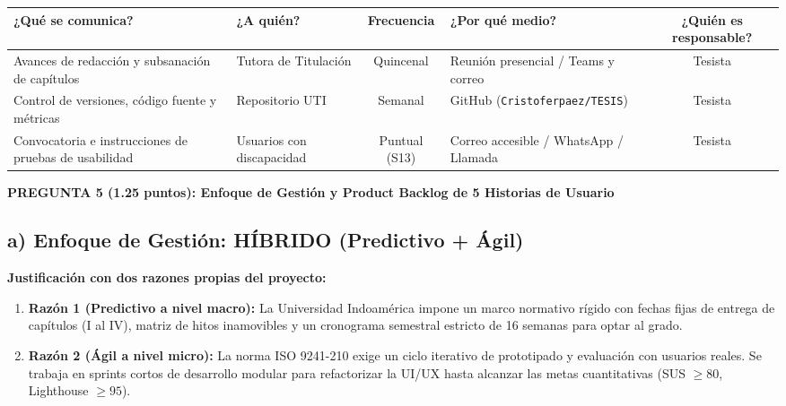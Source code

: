 \documentclass[10pt,a4paper]{article}
\begin{document}
\begin{center}
\footnotesize
\renewcommand{\arraystretch}{1.15}
\begin{tabularx}{\textwidth}{X X c X c}
\toprule
\textbf{¿Qué se comunica?} & \textbf{¿A quién?} & \textbf{Frecuencia} & \textbf{¿Por qué medio?} & \textbf{¿Quién es responsable?} \\
\midrule
Avances de redacción y subsanación de capítulos & Tutora de Titulación & Quincenal & Reunión presencial / Teams y correo & Tesista \\
Control de versiones, código fuente y métricas & Repositorio UTI & Semanal & GitHub (\texttt{Cristoferpaez/TESIS}) & Tesista \\
Convocatoria e instrucciones de pruebas de usabilidad & Usuarios con discapacidad & Puntual (S13) & Correo accesible / WhatsApp / Llamada & Tesista \\
\bottomrule
\end{tabularx}
\end{center}

\vspace{0.2cm}

\begin{tcolorbox}[colback=utiLightBlue, colframe=utiBlue, arc=3pt, left=6pt, right=6pt, top=4pt, bottom=4pt]
\textbf{\color{utiNavy}PREGUNTA 5 (1.25 puntos): Enfoque de Gestión y Product Backlog de 5 Historias de Usuario}
\end{tcolorbox}

\subsection*{\normalsize\color{utiNavy}a) Enfoque de Gestión: HÍBRIDO (Predictivo + Ágil)}
\textbf{Justificación con dos razones propias del proyecto:}
\begin{enumerate}\setlength\itemsep{1pt}\small
    \item \textbf{Razón 1 (Predictivo a nivel macro):} La Universidad Indoamérica impone un marco normativo rígido con fechas fijas de entrega de capítulos (I al IV), matriz de hitos inamovibles y un cronograma semestral estricto de 16 semanas para optar al grado.
    \item \textbf{Razón 2 (Ágil a nivel micro):} La norma ISO 9241-210 exige un ciclo iterativo de prototipado y evaluación con usuarios reales. Se trabaja en sprints cortos de desarrollo modular para refactorizar la UI/UX hasta alcanzar las metas cuantitativas (SUS $\ge 80$, Lighthouse $\ge 95$).
\end{enumerate}
\end{document}
